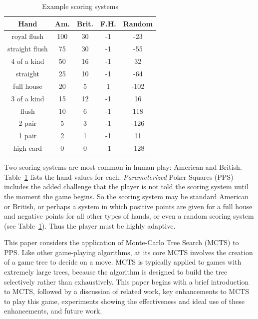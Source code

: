 \documentclass[letterpaper]{article}
\begin{document}
\begin{table}
\caption{Example scoring systems}
\label{tbl:scoring}
\centering
\begin{tabular}{c c c c c}
\hline
Hand & Am. & Brit. & F.H. & Random \\
\hline
royal flush     & 100 & 30 & -1 & -23 \\
straight flush & 75 & 30 & -1 & -55 \\
4 of a kind    & 50 & 16 & -1 & 32 \\
straight        & 25 & 10 & -1 & -64 \\
full house     & 20 & 5  & 1 & -102 \\
3 of a kind   & 15 & 12 & -1 & 16 \\
flush           & 10 & 6   & -1 & 118 \\
2 pair         & 5   & 3   & -1 & -126 \\
1 pair         & 2   & 1   & -1 & 11 \\
high card    & 0   & 0   & -1 & -128 \\
\hline
\end{tabular}
\end{table}

Two scoring systems are most common in human play: American and British. Table~\ref{tbl:scoring} lists the hand values for each. {\it Parameterized} Poker Squares (PPS) includes the added challenge that the player is not told the scoring system until the moment the game begins. So the scoring system may be standard American or British, or perhaps a system in which positive points are given for a full house and negative points for all other types of hands, or even a random scoring system (see Table~\ref{tbl:scoring}). Thus the player must be highly adaptive.


This paper considers the application of Monte-Carlo Tree Search (MCTS) to PPS. Like other game-playing algorithms, at its core MCTS involves the creation of a game tree to decide on a move. MCTS is typically applied to games with extremely large trees, because the algorithm is designed to build the tree selectively rather than exhaustively. This paper begins with a brief introduction to MCTS, followed by a discussion of related work, key enhancements to MCTS to play this game, experiments showing the effectiveness and ideal use of these enhancements, and future work.
\end{document}
